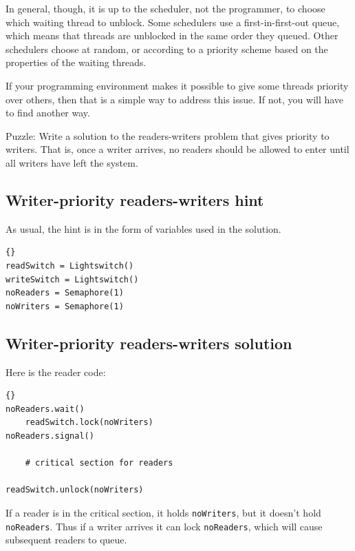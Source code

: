 \documentclass{book}
\begin{document}
In general, though, it is up to the scheduler, not the programmer,
to choose which waiting thread to unblock.
Some schedulers use a first-in-first-out queue, which means
that threads are unblocked in the same order they queued.
Other schedulers choose at random, or according to
a priority scheme based on the properties of the waiting
threads.

If your programming environment makes it possible to give
some threads priority over others, then that is a simple way
to address this issue.  If not, you will have to find another
way.

Puzzle: Write a solution to the readers-writers problem that gives
priority to writers.  That is, once a writer arrives, no readers
should be allowed to enter until all writers have left the system.



{\raggedright\subsection{Writer-priority readers-writers hint}}

As usual, the hint is in the form of variables
used in the solution.

\begin{lstlisting}[title={Writer-priority readers-writers initialization}]{}
readSwitch = Lightswitch()
writeSwitch = Lightswitch()
noReaders = Semaphore(1)
noWriters = Semaphore(1)
\end{lstlisting}



\subsection{Writer-priority readers-writers solution}

Here is the reader code:

\begin{lstlisting}[title={Writer-priority reader solution}]{}
noReaders.wait()
    readSwitch.lock(noWriters)
noReaders.signal()

    # critical section for readers

readSwitch.unlock(noWriters)
\end{lstlisting}

If a reader is in the critical section, it holds
    {\tt noWriters}, but it doesn't hold {\tt noReaders}.
Thus if a writer arrives it can lock {\tt noReaders},
which will cause subsequent readers to queue.
\end{document}
